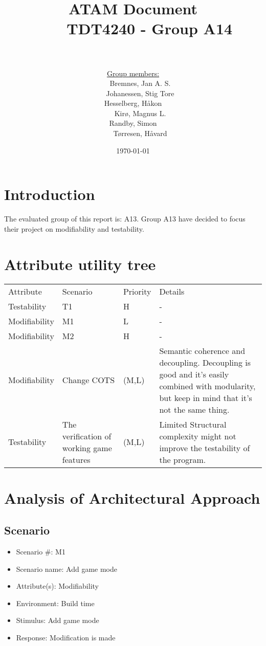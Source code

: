 \documentclass[12pt, a4paper]{article}
\title{
	ATAM Document \\
    TDT4240 - Group A14 \\
	\\
	}
\author{
	\underline{Group members:} \\
    Bremnes, Jan A. S.\\
    Johanessen, Stig Tore\\
	Hesselberg, Håkon \\
    Kirø, Magnus L.\\
	Randby, Simon \\
    Tørresen, Håvard\\
}
\date{\today}
\begin{document}
\maketitle
{}

\tableofcontents

\section{Introduction}
The evaluated group of this report is: A13. 
Group A13 have decided to focus their project on modifiability and testability. 

\section{Attribute utility tree}
\begin{tabular}{ p{} p{} p{}
p{} }
Attribute & Scenario & Priority & Details \\
Testability & T1 & H & - \\
Modifiability & M1 & L & - \\
Modifiability & M2 & H & - \\
Modifiability & Change COTS & (M,L) & Semantic coherence and decoupling.
Decoupling is good and it’s easily combined with modularity, but keep in mind that it’s not the same thing. \\
Testability & The verification of working game features & (M,L) & Limited Structural complexity might not improve the testability of the program. \\
\end{tabular}

\section{Analysis of Architectural Approach}

\subsection{Scenario}
\begin{itemize}
	\item Scenario #: M1
	\item Scenario name: Add game mode
	\item Attribute(s): Modifiability
	\item Environment: Build time
	\item Stimulus: Add game mode
	\item Response: Modification is made
\end{itemize}
\end{document}
